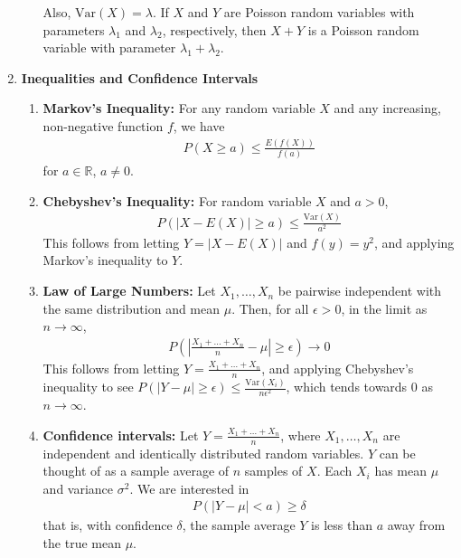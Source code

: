 \documentclass[10pt]{article}
\begin{document}
\begin{multicols}{2}
\begin{enumerate}
\begin{enumerate}
            Also, $\text{Var}(X)=\lambda$. If $X$ and $Y$ are Poisson random variables with parameters $\lambda_1$ and $\lambda_2$, respectively, then $X+Y$ is a Poisson random variable with parameter $\lambda_1 + \lambda_2$.
        \end{enumerate}
        \item \textbf{Inequalities and Confidence Intervals}
        \begin{enumerate}
            \item \textbf{Markov's Inequality:} For any random variable $X$ and any increasing, non-negative function $f$, we have
            \begin{align*}
                P(X \geq a) \leq \frac{E(f(X))}{f(a)}
            \end{align*}
            for $a \in \mathbb{R}$, $a \neq 0$.
            \item \textbf{Chebyshev's Inequality:} For random variable $X$ and $a > 0$,
            \begin{align*}
                P(|X-E(X)| \geq a) \leq \frac{\text{Var}(X)}{a^2}
            \end{align*}
            This follows from letting $Y=|X-E(X)|$ and $f(y)=y^2$, and applying Markov's inequality to $Y$.
            \item \textbf{Law of Large Numbers:} Let $X_1, \ldots, X_n$ be pairwise independent with the same distribution and mean $\mu$. Then, for all $\epsilon > 0$, in the limit as $n \rightarrow \infty$,
            \begin{align*}
                P\left(\left|\frac{X_1+\ldots+X_n}{n} - \mu \right| \geq \epsilon \right) \rightarrow 0
            \end{align*}
            This follows from letting $Y=\frac{X_1+\ldots+X_n}{n}$, and applying Chebyshev's inequality to see $P(|Y - \mu| \geq \epsilon) \leq \frac{\text{Var}(X_i)}{n\epsilon^2}$, which tends towards 0 as $n \rightarrow \infty$.
            \item \textbf{Confidence intervals:} Let $Y=\frac{X_1+\ldots+X_n}{n}$, where $X_1, \ldots, X_n$ are independent and identically distributed random variables. $Y$ can be thought of as a sample average of $n$ samples of $X$. Each $X_i$ has mean $\mu$ and variance $\sigma^2$. We are interested in
            \begin{align*}
                P(|Y-\mu| < a) \geq \delta
            \end{align*}
            that is, with confidence $\delta$, the sample average $Y$ is less than $a$ away from the true mean $\mu$. \\

\end{enumerate}
\end{enumerate}
\end{multicols}
\end{document}
